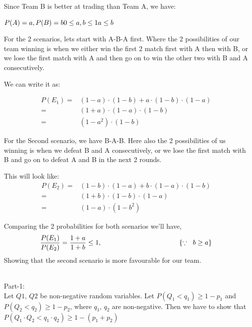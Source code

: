 \documentclass[a4paper,12pt,answers]{exam}
\begin{document}
\begin{questions}
\begin{solution}
Since Team B is better at trading than Team A, we have:

\begin{center}
    \begin{math}
        P(A) = a , 
        P(B) = b \\
        0 \leq a,b \leq 1 \\
        a \leq b
    \end{math}
\end{center}

For the 2 scenarios, lets start with A-B-A first. Where the 2 possibilities of our team winning is when we either win the first 2 match first with A then with B, or we lose the first match with A and then go on to win the other two with B and A consecutively.

We can write it as:

\[
\begin{aligned}
    P(E_1) =& (1-a)\cdot(1-b) + a\cdot(1-b)\cdot(1-a)\\
    =& (1+a)\cdot(1-a)\cdot(1-b)\\
    =& (1-a^2)\cdot(1-b)
\end{aligned}
\]

For the Second scenario, we have B-A-B. Here also the 2 possibilities of us winning is when we defeat B and A consecutively, or we lose the first match with B and go on to defeat A and B in the next 2 rounds.

This will look like:
\[
\begin{aligned}
P(E_2) =& (1-b)\cdot(1-a) + b\cdot(1-a)\cdot(1-b)\\
=& (1+b)\cdot(1-b)\cdot(1-a)\\
=& (1-a)\cdot(1-b^2)
\end{aligned}
\]
    

Comparing the 2 probabilities for both scenarios we'll have,
\begin{align*}
    \frac{P(E_1)}{P(E_2)} = \frac{1+a}{1+b} \leq 1, \hspace{40 mm} \{\because \hspace{2 mm}b \geq a\}
\end{align*}
Showing that the second scenario is more favourable for our team.

\end{solution}


\begin{solution}\\
Part-1:\\
Let $Q1$, $Q2$ be non-negative random variables. Let $P(Q_1 < q_1) \geq 1 - p_1$ and $P(Q_2 < q_2) \geq 1 - p_2$,
where $q_1$, $q_2$ are non-negative. Then we have to show that $P(Q_1\cdot Q_2 < q_1\cdot q_2) \geq 1 - (p_1 + p_2)$


\end{solution}
\end{questions}
\end{document}

